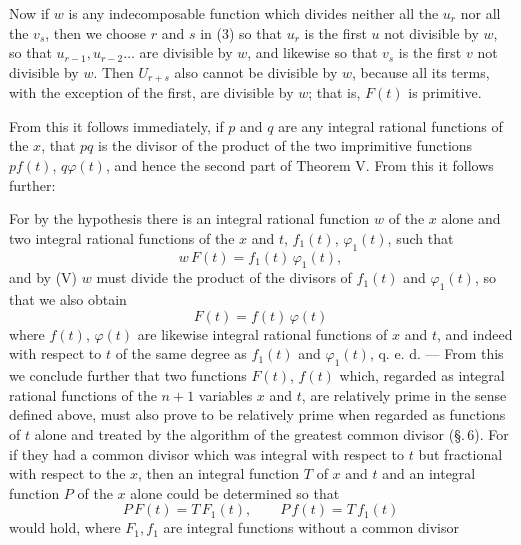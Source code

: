 
Now if $w$ is any indecomposable function which divides neither
all the $u_r$ nor all the $v_s$, then we choose $r$ and $s$ in (3)
so that $u_r$ is the first $u$ not divisible by $w$, so that
$u_{r-1}, u_{r-2}\dots$ are divisible by $w$, and likewise so that $v_s$ is the
first $v$ not divisible by $w$. Then $U_{r+s}$ also cannot
be divisible by $w$, because all its terms, with the exception
of the first, are divisible by $w$; that is, $F(t)$ is primitive.

From this it follows immediately, if $p$ and $q$ are any integral
rational functions of the $x$, that $pq$ is the divisor of the product
of the two imprimitive functions $pf(t)$, $q\varphi(t)$, and hence
the second part of Theorem V. From this it follows further:


For by the hypothesis there is an integral rational
function $w$ of the $x$ alone and two integral rational functions
of the $x$ and $t$, $f_1(t)$, $\varphi_1(t)$, such that
\[
w\,F(t) = f_1(t)\,\varphi_1(t),
\]
and by (V) $w$ must divide the product of the divisors of $f_1(t)$ and
$\varphi_1(t)$, so that we also obtain
\[
F(t) = f(t)\,\varphi(t)
\]
where $f(t)$, $\varphi(t)$ are likewise integral rational functions
of $x$ and $t$, and indeed with respect to $t$ of the same degree as
$f_1(t)$ and $\varphi_1(t)$, q. e. d. --- From this we conclude further
that two functions $F(t)$, $f(t)$ which, regarded as integral rational functions
of the $n+1$ variables $x$ and $t$, are relatively prime in the sense
defined above, must also prove to be relatively prime when regarded
as functions of $t$ alone and treated by the algorithm of the greatest
common divisor (\S.\,6). For if they had a common divisor which
was integral with respect to $t$ but fractional with respect to the $x$,
then an integral function $T$ of $x$ and $t$ and an integral function
$P$ of the $x$ alone could be determined so that
\[
P\,F(t) = T\,F_1(t), \qquad P\,f(t) = T\,f_1(t)
\]
would hold, where $F_1, f_1$ are integral functions without a common divisor
